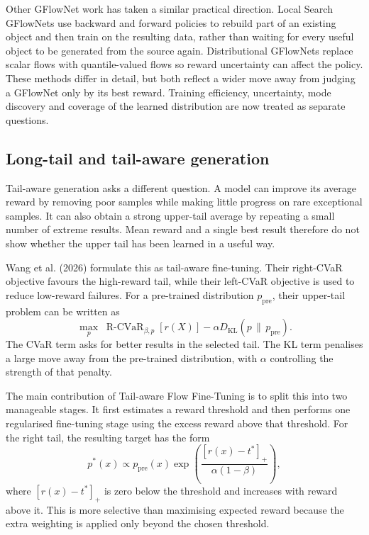 \documentclass{article}
\begin{document}
Other GFlowNet work has taken a similar practical direction. Local Search GFlowNets use backward and forward policies to rebuild part of an existing object and then train on the resulting data, rather than waiting for every useful object to be generated from the source again. Distributional GFlowNets replace scalar flows with quantile-valued flows so reward uncertainty can affect the policy. These methods differ in detail, but both reflect a wider move away from judging a GFlowNet only by its best reward. Training efficiency, uncertainty, mode discovery and coverage of the learned distribution are now treated as separate questions.

\subsection{Long-tail and tail-aware generation}

Tail-aware generation asks a different question. A model can improve its average reward by removing poor samples while making little progress on rare exceptional samples. It can also obtain a strong upper-tail average by repeating a small number of extreme results. Mean reward and a single best result therefore do not show whether the upper tail has been learned in a useful way.

Wang et al. (2026) formulate this as tail-aware fine-tuning. Their right-CVaR objective favours the high-reward tail, while their left-CVaR objective is used to reduce low-reward failures. For a pre-trained distribution $p_{\mathrm{pre}}$, their upper-tail problem can be written as
\begin{equation}
\max_p \; \operatorname{R\text{-}CVaR}_{\beta,p}[r(X)]
-\alpha D_{\mathrm{KL}}\!\left(p\,\|\,p_{\mathrm{pre}}\right).
\end{equation}
The CVaR term asks for better results in the selected tail. The KL term penalises a large move away from the pre-trained distribution, with $\alpha$ controlling the strength of that penalty.

The main contribution of Tail-aware Flow Fine-Tuning is to split this into two manageable stages. It first estimates a reward threshold and then performs one regularised fine-tuning stage using the excess reward above that threshold. For the right tail, the resulting target has the form
\begin{equation}
p^*(x)\propto p_{\mathrm{pre}}(x)
\exp\!\left(
\frac{[r(x)-t^*]_+}{\alpha(1-\beta)}
\right),
\end{equation}
where $[r(x)-t^*]_+$ is zero below the threshold and increases with reward above it. This is more selective than maximising expected reward because the extra weighting is applied only beyond the chosen threshold.
\end{document}
